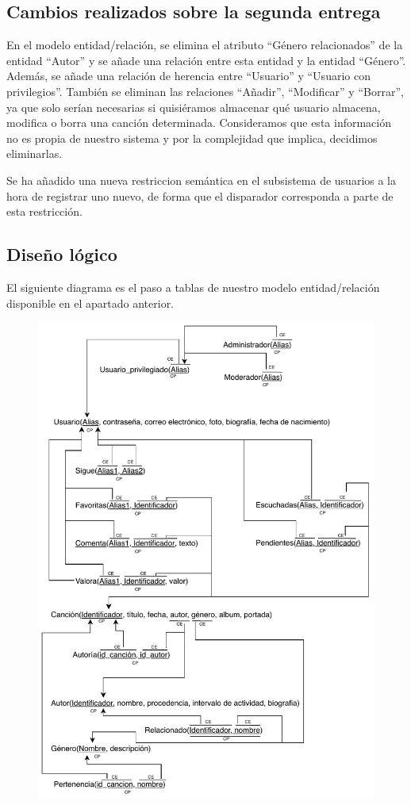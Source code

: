 \subsection{Cambios realizados sobre la segunda entrega}

En el modelo entidad/relación, se elimina el atributo ``Género relacionados'' de la entidad ``Autor'' y se añade una relación entre esta entidad y la entidad ``Género''. Además, se añade una relación de herencia entre ``Usuario'' y ``Usuario con privilegios''. También se eliminan las relaciones ``Añadir'', ``Modificar'' y ``Borrar'', ya que solo serían necesarias si quisiéramos almacenar qué usuario almacena, modifica o borra una canción determinada. Consideramos que esta información no es propia de nuestro sistema y por la complejidad que implica, decidimos eliminarlas.

Se ha añadido una nueva restriccion semántica en el subsistema de usuarios a la hora de registrar uno nuevo, de forma que el disparador corresponda a parte de esta restricción.

\subsection{Diseño lógico}

El siguiente diagrama es el paso a tablas de nuestro modelo entidad/relación disponible en el apartado anterior.

\begin{figure}[H]
  \centering
  \includegraphics[scale=0.9]{diagramas/paso_a_tablas.pdf}
\end{figure}

